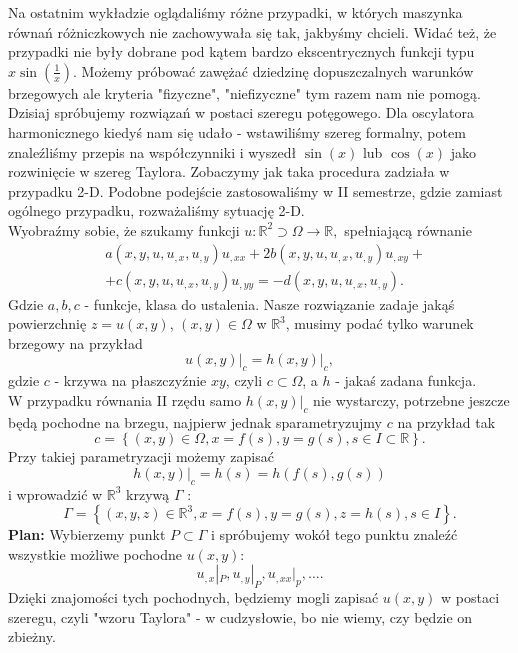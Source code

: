 \documentclass[../main.tex]{subfiles}
\begin{document}
		Na ostatnim wykładzie oglądaliśmy różne przypadki, w których maszynka równań różniczkowych nie zachowywała się tak, jakbyśmy chcieli. Widać też, że przypadki nie były dobrane pod kątem bardzo ekscentrycznych funkcji typu $x \sin\left( \frac{1}{x} \right) $. Możemy próbować zawężać dziedzinę dopuszczalnych warunków brzegowych ale kryteria "fizyczne", "niefizyczne" tym razem nam nie pomogą. Dzisiaj spróbujemy rozwiązań w postaci szeregu potęgowego. Dla oscylatora harmonicznego kiedyś nam się udało - wstawiliśmy szereg formalny, potem znaleźliśmy przepis na współczynniki i wyszedł $\sin(x)$ lub $\cos(x)$ jako rozwinięcie w szereg Taylora. Zobaczymy jak taka procedura zadziała w przypadku  2-D. Podobne podejście zastosowaliśmy w II semestrze, gdzie zamiast ogólnego przypadku, rozważaliśmy sytuację 2-D.\\
		Wyobraźmy sobie, że szukamy funkcji $u:\mathbb{R}^2\supset\Omega\to\mathbb{R},$ spełniającą równanie
		\begin{align*}
				&a(x,y,u,u_{,x},u_{,y})u_{,x x} + 2b(x,y,u,u_{,x},u_{,y})u_{,xy} +\\
				&+ c(x,y,u,u_{,x},u_{,y})u_{,y y} = -d(x,y,u,u_{,x},u_{,y})
		.\end{align*}
		Gdzie $a,b,c$ - funkcje, klasa do ustalenia. Nasze rozwiązanie zadaje jakąś powierzchnię $z = u(x,y)$, $(x,y)\in \Omega$ w  $\mathbb{R}^3$, musimy podać tylko warunek brzegowy na przykład
		\[
				\left.u(x,y)\right|_{c} =\left.h(x,y)\right|_{c}
		,\]
		gdzie $c$ - krzywa na płaszczyźnie $xy$, czyli  $c \subset \Omega$, a $h$ - jakaś zadana funkcja.\\
		W przypadku równania II rzędu samo $h(x,y)|_c$ nie wystarczy, potrzebne jeszcze będą pochodne na brzegu, najpierw jednak sparametryzujmy $c$ na przykład tak
		\[
				c = \left\{ (x,y)\in \Omega, x = f(s), y = g(s), s\in I \subset \mathbb{R} \right\}
		.\]
		Przy takiej parametryzacji możemy zapisać
		\[
				\left.h(x,y)\right|_c = h(s) = h(f(s),g(s))
		\]
		i wprowadzić w $\mathbb{R}^3$ krzywą $\Gamma$ :
		\[
				\Gamma = \left\{ (x,y,z)\in \mathbb{R}^3, x = f(s), y = g(s), z = h(s), s\in I \right\}
		.\]
		\textbf{Plan:} Wybierzemy punkt $P\subset\Gamma$ i spróbujemy wokół tego punktu znaleźć wszystkie możliwe pochodne $u(x,y) :$
		\[
		u_{,x}|_P, u_{,y}|_P, u_{,x x}|_p,\ldots
		.\]
		Dzięki znajomości tych pochodnych, będziemy mogli zapisać $u(x,y)$ w postaci szeregu, czyli "wzoru Taylora" - w cudzysłowie, bo nie wiemy, czy będzie on zbieżny.
\end{document}
